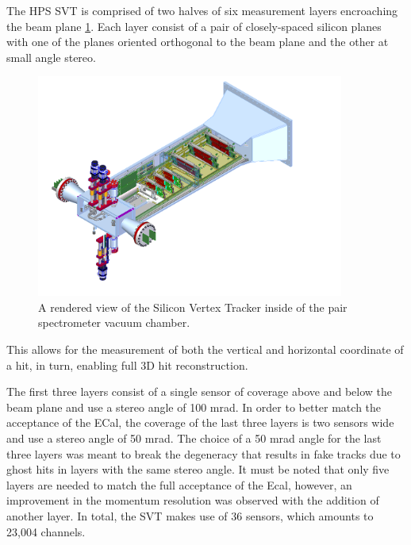 The HPS SVT is comprised of two halves of six measurement layers encroaching the
beam plane \ref{fig:svt_layout_render}. Each layer consist of a pair of
closely-spaced silicon planes with one of the planes oriented orthogonal to
the beam plane and the other at small angle stereo.
\begin{figure}[h]
    \centering
    \includegraphics[width=0.9\textwidth]{images/svt_layout_render.png}
    \caption{A rendered view of the Silicon Vertex Tracker inside of the pair
             spectrometer vacuum chamber.}
    \label{fig:svt_layout_render}
\end{figure}
This allows
for the measurement of both the vertical and horizontal coordinate of a hit, in turn, 
enabling full 3D hit reconstruction.  

The first three layers consist of a single sensor of coverage above and below
the beam plane and use a stereo angle of 100 mrad. In order to better match the
acceptance of the ECal, the coverage of the last three layers is two sensors 
wide and use a stereo angle of 50 mrad.  The choice of a 50 mrad angle for the
last three layers was meant to break the degeneracy that results in fake tracks
due to ghost hits in layers with the same stereo angle.  It must be noted that
only five layers are needed to match the full acceptance of the Ecal, however,
an improvement in the momentum resolution was observed with the addition of 
another layer.  In total, the SVT makes use of 36 sensors, which amounts to 
23,004 channels.


